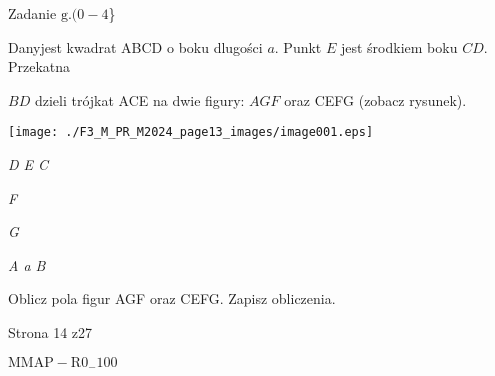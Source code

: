 \documentclass[a4paper,12pt]{article}
\begin{document}
Zadanie $\mathrm{g}. (0-4$\}

Danyjest kwadrat ABCD o boku dlugości $a$. Punkt $E$ jest środkiem boku $CD$. Przekatna

$BD$ dzieli trójkat ACE na dwie figury: $AGF$ oraz CEFG (zobacz rysunek).
\begin{center}
\texttt{[image: ./F3\_M\_PR\_M2024\_page13\_images/image001.eps]}
\end{center}
{\it D E  C}

{\it F}

{\it G}

{\it A  a  B}

Oblicz pola figur AGF oraz CEFG. Zapisz obliczenia.

Strona 14 z27

$\mathrm{M}\mathrm{M}\mathrm{A}\mathrm{P}-\mathrm{R}0_{-}100$
\end{document}

